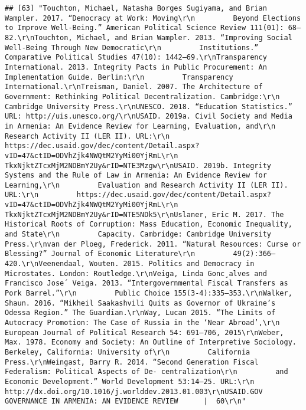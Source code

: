\documentclass[
]{article}
\begin{document}
\begin{verbatim}
## [63] "Touchton, Michael, Natasha Borges Sugiyama, and Brian Wampler. 2017. “Democracy at Work: Moving\r\n         Beyond Elections to Improve Well-Being.” American Political Science Review 111(01): 68–82.\r\nTouchton, Michael, and Brian Wampler. 2013. “Improving Social Well-Being Through New Democratic\r\n         Institutions.” Comparative Political Studies 47(10): 1442–69.\r\nTransparency International. 2013. Integrity Pacts in Public Procurement: An Implementation Guide. Berlin:\r\n         Transparency International.\r\nTreisman, Daniel. 2007. The Architecture of Government: Rethinking Political Decentralization. Cambridge:\r\n         Cambridge University Press.\r\nUNESCO. 2018. “Education Statistics.” URL: http://uis.unesco.org/\r\nUSAID. 2019a. Civil Society and Media in Armenia: An Evidence Review for Learning, Evaluation, and\r\n         Research Activity II (LER II). URL:\r\n         https://dec.usaid.gov/dec/content/Detail.aspx?vID=47&ctID=ODVhZjk4NWQtM2YyMi00YjRmL\r\n         TkxNjktZTcxMjM2NDBmY2Uy&rID=NTE3Mzgw\r\nUSAID. 2019b. Integrity Systems and the Rule of Law in Armenia: An Evidence Review for Learning,\r\n         Evaluation and Research Activity II (LER II). URL:\r\n         https://dec.usaid.gov/dec/content/Detail.aspx?vID=47&ctID=ODVhZjk4NWQtM2YyMi00YjRmL\r\n         TkxNjktZTcxMjM2NDBmY2Uy&rID=NTE5NDk5\r\nUslaner, Eric M. 2017. The Historical Roots of Corruption: Mass Education, Economic Inequality, and State\r\n         Capacity. Cambridge: Cambridge University Press.\r\nvan der Ploeg, Frederick. 2011. “Natural Resources: Curse or Blessing?” Journal of Economic Literature\r\n         49(2):366–420.\r\nVeenendaal, Wouten. 2015. Politics and Democracy in Microstates. London: Routledge.\r\nVeiga, Linda Gonc¸alves and Francisco Jose´ Veiga. 2013. “Intergovernmental Fiscal Transfers as Pork Barrel.”\r\n         Public Choice 155(3-4):335–353.\r\nWalker, Shaun. 2016. “Mikheil Saakashvili Quits as Governor of Ukraine’s Odessa Region.” The Guardian.\r\nWay, Lucan 2015. “The Limits of Autocracy Promotion: The Case of Russia in the ‘Near Abroad’,\r\n         European Journal of Political Research 54: 691–706, 2015\r\nWeber, Max. 1978. Economy and Society: An Outline of Interpretive Sociology. Berkeley, California: University of\r\n         California Press.\r\nWeingast, Barry R. 2014. “Second Generation Fiscal Federalism: Political Aspects of De- centralization\r\n         and Economic Development.” World Development 53:14–25. URL:\r\n         http://dx.doi.org/10.1016/j.worlddev.2013.01.003\r\nUSAID.GOV                                                    GOVERNANCE IN ARMENIA: AN EVIDENCE REVIEW      |  60\r\n"                                                                                                                                                                                                                                                                                                                                                                                                                                                                                                                                                                                                                                                                   
\end{verbatim}
\end{document}
